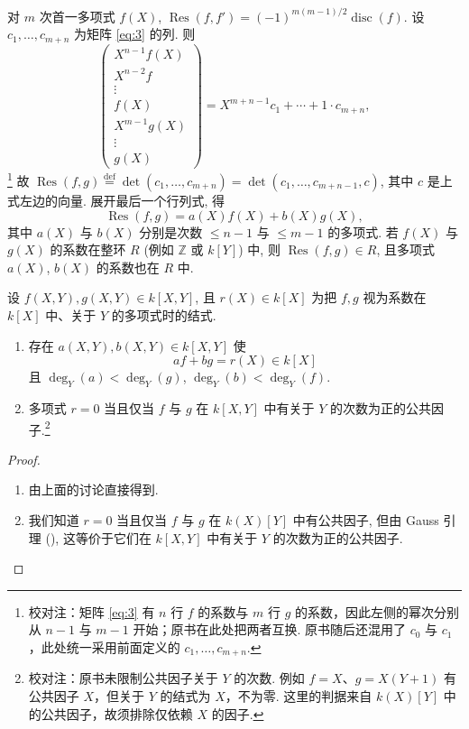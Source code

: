 \begin{example} \label{thm:1.1.23} 
对 $m$ 次首一多项式 $f(X)$, $\operatorname{Res}(f, f') = (-1)^{m(m-1)/2}\operatorname{disc}(f)$. 设 $c_1,\dots,c_{m+n}$ 为矩阵 \eqref{eq:3} 的列. 则
\[
\begin{pmatrix}X^{n-1}f(X)\\ X^{n-2}f\\ \vdots\\ f(X)\\ X^{m-1}g(X)\\ \vdots\\ g(X)\end{pmatrix}
= X^{m+n-1}c_1 + \cdots + 1\cdot c_{m+n},
\]
\footnote{校对注：矩阵 \eqref{eq:3} 有 $n$ 行 $f$ 的系数与 $m$ 行 $g$ 的系数，因此左侧的幂次分别从 $n-1$ 与 $m-1$ 开始；原书在此处把两者互换. 原书随后还混用了 $c_0$ 与 $c_1$，此处统一采用前面定义的 $c_1,\dots,c_{m+n}$.} 故 $\operatorname{Res}(f,g) \overset{\text{def}}{=} \det(c_1,\dots,c_{m+n}) = \det(c_1,\dots,c_{m+n-1}, c)$, 其中 $c$ 是上式左边的向量. 展开最后一个行列式, 得
\[
\operatorname{Res}(f,g) = a(X)f(X) + b(X)g(X),
\]
其中 $a(X)$ 与 $b(X)$ 分别是次数 $\le n-1$ 与 $\le m-1$ 的多项式. 若 $f(X)$ 与 $g(X)$ 的系数在整环 $R$ (例如 $\mathbb{Z}$ 或 $k[Y]$) 中, 则 $\operatorname{Res}(f,g)\in R$, 且多项式 $a(X)$, $b(X)$ 的系数也在 $R$ 中.
\end{example}

\begin{proposition} \label{thm:1.1.24} 
设 $f(X,Y), g(X,Y)\in k[X,Y]$, 且 $r(X)\in k[X]$ 为把 $f, g$ 视为系数在 $k[X]$ 中、关于 $Y$ 的多项式时的结式.
\begin{enumerate}[label=\textup{(\alph*)}]
\item 存在 $a(X,Y), b(X,Y)\in k[X,Y]$ 使
\[
af + bg = r(X)\in k[X]
\]
且 $\deg_Y(a) < \deg_Y(g)$, $\deg_Y(b) < \deg_Y(f)$.
\item 多项式 $r = 0$ 当且仅当 $f$ 与 $g$ 在 $k[X,Y]$ 中有关于 $Y$ 的次数为正的公共因子.\footnote{校对注：原书未限制公共因子关于 $Y$ 的次数. 例如 $f=X$、$g=X(Y+1)$ 有公共因子 $X$，但关于 $Y$ 的结式为 $X$，不为零. 这里的判据来自 $k(X)[Y]$ 中的公共因子，故须排除仅依赖 $X$ 的因子.}
\end{enumerate}
\end{proposition}

\begin{proof}
\begin{enumerate}[label=\textup{(\alph*)}]
\item 由上面的讨论直接得到.
\item 我们知道 $r = 0$ 当且仅当 $f$ 与 $g$ 在 $k(X)[Y]$ 中有公共因子, 但由 Gauss 引理 (\cite[4.5]{milne-ca}), 这等价于它们在 $k[X,Y]$ 中有关于 $Y$ 的次数为正的公共因子.
\end{enumerate}
\end{proof}

